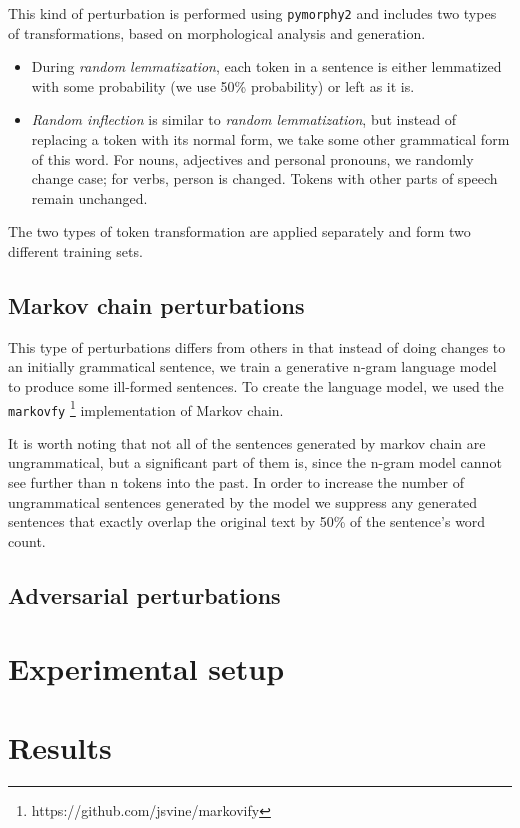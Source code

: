 \documentclass[11pt,a4paper]{article}
\begin{document}
This kind of perturbation is performed using \texttt{pymorphy2} \cite{pymorphy2} and includes two types of transformations, based on morphological analysis and generation.

\begin{itemize}
    \item During \emph{random lemmatization}, each token in a sentence is either lemmatized with some probability (we use 50\% probability) or left as it is.
    \item \emph{Random inflection} is similar to \emph{random lemmatization}, but instead of replacing a token with its normal form, we take some other grammatical form of this word. For nouns, adjectives and personal pronouns, we randomly change case; for verbs, person is changed. Tokens with other parts of speech remain unchanged.
\end{itemize}

The two types of token transformation are applied separately and form two different training sets.

\subsection{Markov chain perturbations}

This type of perturbations differs from others in that instead of doing changes to an initially grammatical sentence, we train a generative n-gram language model to produce some ill-formed sentences. To create the language model, we used the \texttt{markovfy} \footnote{https://github.com/jsvine/markovify} implementation of Markov chain.

It is worth noting that not all of the sentences generated by markov chain are ungrammatical, but a significant part of them is, since the n-gram model cannot see further than n tokens into the past. In order to increase the number of ungrammatical sentences generated by the model we suppress any generated sentences that exactly overlap the original text by 50\% of the sentence's word count.

\subsection{Adversarial perturbations}

\section{Experimental setup}
\label{sec:setup}

\section{Results}
\label{sec:results}
{}

\end{document}
